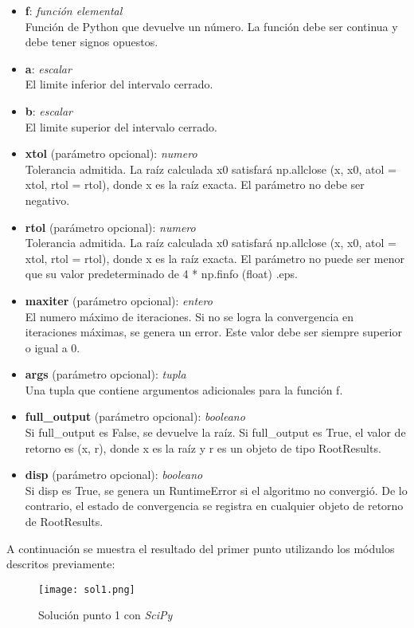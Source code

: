 \documentclass{article}
\begin{document}
\begin{itemize}
    \item \textbf{f}: \emph{función elemental}\\
    Función de Python que devuelve un número. La función debe ser continua y debe tener signos opuestos.
    \item \textbf{a}: \emph{escalar}\\
    El limite inferior del intervalo cerrado.
    \item \textbf{b}: \emph{escalar}\\
    El limite superior del intervalo cerrado.
    \item \textbf{xtol} (parámetro opcional): \emph{numero}\\
    Tolerancia admitida. La raíz calculada x0 satisfará np.allclose (x, x0, atol = xtol, rtol = rtol), donde x es la raíz exacta. El parámetro no debe ser negativo.
    \item \textbf{rtol} (parámetro opcional): \emph{numero}\\
    Tolerancia admitida. La raíz calculada x0 satisfará np.allclose (x, x0, atol = xtol, rtol = rtol), donde x es la raíz exacta. El parámetro no puede ser menor que su valor predeterminado de 4 * np.finfo (float) .eps.
    \item \textbf{maxiter} (parámetro opcional): \emph{entero}\\
    El numero máximo de iteraciones. Si no se logra la convergencia en iteraciones máximas, se genera un error. Este valor debe ser siempre superior o igual a 0.
    \item \textbf{args} (parámetro opcional): \emph{tupla}\\
    Una tupla que contiene argumentos adicionales para la función f.
    \item \textbf{full\_output} (parámetro opcional): \emph{booleano}\\
    Si full\_output es False, se devuelve la raíz. Si full\_output es True, el valor de retorno es (x, r), donde x es la raíz y r es un objeto  de tipo RootResults.
    \item \textbf{disp} (parámetro opcional): \emph{booleano}\\
    Si disp es True, se genera un RuntimeError si el algoritmo no convergió. De lo contrario, el estado de convergencia se registra en cualquier objeto de retorno de RootResults.
\end{itemize}
A continuación se muestra el resultado del primer punto utilizando los módulos descritos previamente:
\begin{figure}[H]
    \centering
    \texttt{[image: sol1.png]}
    \caption{Solución punto 1 con \emph{SciPy}}
    \label{fig:sol1}
\end{figure}
\end{document}
